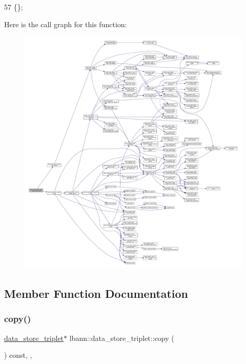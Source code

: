 \begin{DoxyCode}
57 \{\};
\end{DoxyCode}
Here is the call graph for this function\+:\nopagebreak
\begin{figure}[H]
\begin{center}
\leavevmode
\includegraphics[width=350pt]{classlbann_1_1data__store__triplet_a4051f8b3236f06554c2f35e71d3fdf70_cgraph}
\end{center}
\end{figure}


\subsection{Member Function Documentation}
\mbox{\label{classlbann_1_1data__store__triplet_a446ee3b1fa3097e51bd0e198de960cd4}} 
\subsubsection{\texorpdfstring{copy()}{copy()}}
{\footnotesize\ttfamily \hyperlink{classlbann_1_1data__store__triplet}{data\+\_\+store\+\_\+triplet}$\ast$ lbann\+::data\+\_\+store\+\_\+triplet\+::copy (\begin{DoxyParamCaption}{ }\end{DoxyParamCaption}) const\hspace{0.3cm}{\ttfamily [inline]}, {\ttfamily [override]}, {\ttfamily [virtual]}}



